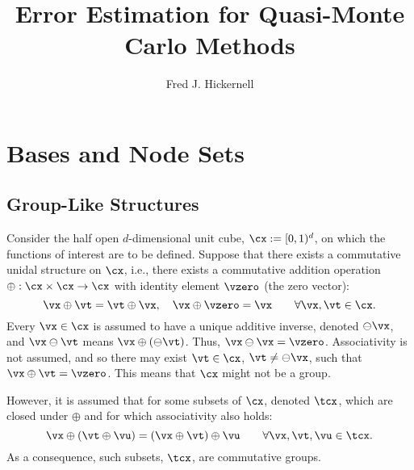 \documentclass[]{elsarticle}
\begin{document}
\begin{frontmatter}

\title{Error Estimation for Quasi-Monte Carlo Methods}
\author{Fred J. Hickernell}
\address{Room E1-208, Department of Applied Mathematics, Illinois Institute of Technology,\\ 10 W.\ 32$^{\text{nd}}$ St., Chicago, IL 60616}
\begin{abstract} 
\end{abstract}

\begin{keyword}


\end{keyword}
\end{frontmatter}

\section{Bases and Node Sets}

\subsection{Group-Like Structures}
Consider the half open $d$-dimensional unit cube, $\cx:=[0,1)^d$, on which the functions of interest are to be defined. Suppose that there exists a commutative unidal structure on $\cx$, i.e., there exists a commutative addition operation $\oplus:\cx \times \cx \to \cx$ with identity element $\vzero$ (the zero vector): 
\[
\vx \oplus \vt = \vt \oplus \vx, \quad \vx \oplus \vzero =\vx \qquad \forall \vx,\vt \in \cx.
\]
Every $\vx \in \cx$ is assumed to have a unique additive inverse,  denoted $\ominus \vx$, and $\vx \ominus \vt$ means $\vx \oplus (\ominus \vt)$.  Thus, $\vx \ominus \vx = \vzero$.  Associativity is not assumed, and so there may exist $\vt \in \cx$, $\vt \ne \ominus \vx$, such that $\vx \oplus \vt = \vzero$.  This means that $\cx$ might not be a group.  

However, it is assumed that for some subsets of $\cx$, denoted $\tcx$, which are closed under $\oplus$ and for which associativity also holds:
\begin{equation} \label{assocprop}
\vx \oplus (\vt \oplus \vu) = (\vx \oplus \vt) \oplus \vu \qquad \forall \vx,\vt,\vu \in \tcx.
\end{equation}
As a consequence, such subsets, $\tcx$, are commutative groups.
\end{document}

